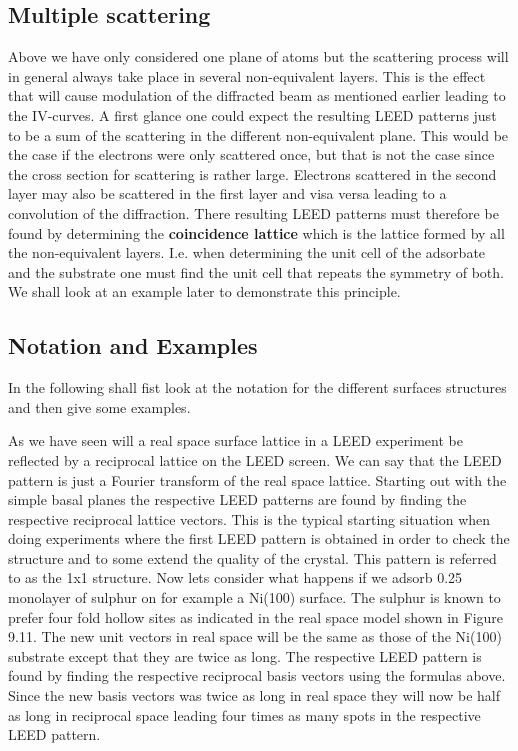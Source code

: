 \subsection{Multiple scattering}
Above we have only considered one plane of atoms but the scattering process will in general always take place in several non-equivalent layers. This is the effect that will cause modulation of the diffracted beam as mentioned earlier leading to the IV-curves. A first glance one could expect the resulting LEED patterns just to be a sum of the scattering in the different non-equivalent plane. This would be the case if the electrons were only scattered once, but that is not the case since the cross section for scattering is rather large. Electrons scattered in the second layer may also be scattered in the first layer and visa versa leading to a convolution of the diffraction. There resulting LEED patterns must therefore be found by determining the {\bf coincidence lattice} which is the lattice formed by all the non-equivalent layers. I.e. when determining the unit cell of the adsorbate and the substrate one must find the unit cell that repeats the symmetry of both. We shall look at an example later to demonstrate this principle.




\subsection{Notation and Examples}

In the following shall fist look at the notation for the different surfaces structures and then give some examples.

As we have seen will a real space surface lattice in a LEED experiment be reflected by a reciprocal lattice on the LEED screen. We can say that the LEED pattern is just a Fourier transform of the real space lattice. Starting out with the  simple basal planes the respective LEED patterns are found by finding the respective reciprocal lattice vectors. This is the typical starting situation when doing experiments where the first LEED pattern is obtained in order to check the structure and  to some extend the quality of the crystal. This pattern is referred to as the 1x1 structure. Now lets consider what happens if we adsorb 0.25 monolayer of sulphur on for example a Ni(100) surface. The sulphur is known to prefer four fold hollow sites as indicated in the real space model shown in Figure 9.11. The new unit vectors in real space will be the same as those of the Ni(100) substrate except that they are twice as long. The respective LEED pattern is found by finding the  respective reciprocal basis vectors using the formulas above. Since the new basis vectors was twice as long in real space they will now be half as long in reciprocal space leading four times as many spots in the respective LEED pattern.

